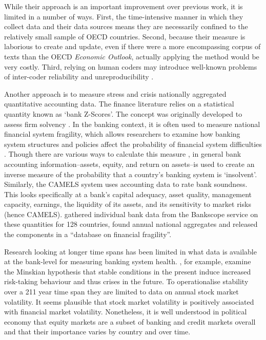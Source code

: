 \documentclass[]{article}
\begin{document}
While their approach is an important improvement over previous work, it is limited in a number of ways. First, the time-intensive manner in which they collect data and their data sources means they are necessarily confined to the relatively small sample of OECD countries. Second, because their measure is laborious to create and update, even if there were a more encompassing corpus of texts than the OECD \emph{Economic Outlook}, actually applying the method would be very costly. Third, relying on human coders may introduce well-known problems of inter-coder reliability and unreproducibility \citep{Minhas2015}.

Another approach is to measure stress and crisis nationally aggregated quantitative accounting data. The finance literature relies on a statistical quantity known as `bank Z-Scores'. The concept was originally developed to assess firm solvency \citep[see][]{roy1952}. In the banking context, it is often used to measure national financial system fragility, which allows researchers to examine how banking system structures and policies affect the probability of financial system difficulties \citep[e.g.][]{beck2013bank,vcihak2010islamic,laeven2009bank,uhde2009}. Though there are various ways to calculate this measure \citep[73]{Lepetit2013}, in general bank accounting information--assets, equity, and return on assets--is used to create an inverse measure of the probability that a country's banking system is `insolvent'. Similarly, the CAMELS system uses accounting data to rate bank soundness. This looks specifically at a bank's capital adequacy, asset quality, management capacity, earnings, the liquidity of its assets, and its sensitivity to market risks (hence CAMELS). \cite{Andrianova2015} gathered individual bank data from the Bankscope service on these quantities for 128 countries, found annual national aggregates and released the components in a ``database on financial fragility''.

Research looking at longer time spans has been limited in what data is available at the bank-level for measuring banking system health. \cite{Danielsson2015}, for example, examine the Minskian \citep{Minsky1982} hypothesis that stable conditions in the present induce increased risk-taking behaviour and thus crises in the future. To operationalise stability over a 211 year time span they are limited to data on annual stock market volatility. It seems plausible that stock market volatility is positively associated with financial market volatility. Nonetheless, it is well understood in political economy \citep[seminally][]{hall2001introduction} that equity markets are a subset of banking and credit markets overall and that their importance varies by country and over time.
\end{document}
